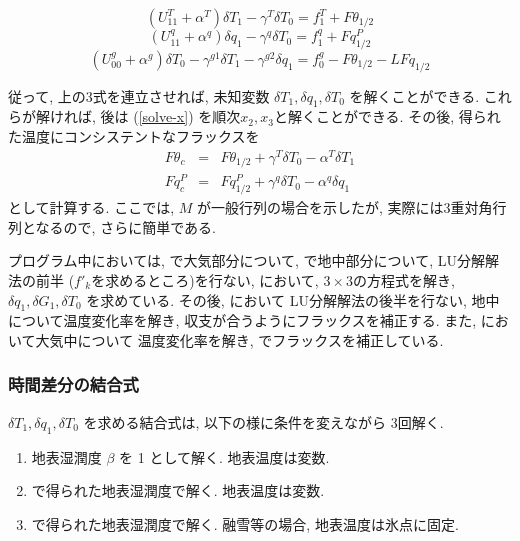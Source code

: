 \begin{equation}
  ( U^{T}_{11} +  \alpha^{T}  ) \delta T_1 - \gamma^{T} \delta T_0 
      = f^{T}_1 + F\theta_{1/2}
\end{equation}
\begin{equation}
  ( U^{q}_{11} +  \alpha^{q}  ) \delta q_1 - \gamma^{q} \delta T_0
      = f^{q}_1 + Fq^P_{1/2}
\end{equation}
\begin{equation}
  ( U^{g}_{00} +  \alpha^{g}  ) \delta T_0 - \gamma^{g1} \delta T_1
                                           - \gamma^{g2} \delta q_1
      = f^{g}_0 - F\theta_{1/2} - L Fq_{1/2}
\end{equation}

従って, 上の3式を連立させれば,
未知変数 $\delta T_1, \delta q_1, \delta T_0$ を解くことができる.
これらが解ければ, 後は
(\ref{solve-x}) を順次$x_2,x_3$と解くことができる.
%
その後, 得られた温度にコンシステントなフラックスを
\begin{eqnarray}
  F\theta_c & = & F\theta_{1/2} 
                   + \gamma^{T} \delta T_0 -\alpha^{T} \delta T_1 \\
  Fq^P_c & = & Fq^P_{1/2} 
                   + \gamma^{q} \delta T_0 -\alpha^{q} \delta q_1
\end{eqnarray}
として計算する.
%
ここでは, $M$ が一般行列の場合を示したが,
実際には3重対角行列となるので, さらに簡単である.

プログラム中においては,
 で大気部分について,
 で地中部分について, LU分解解法の前半
($f'_k$を求めるところ)を行ない, 
 において, $3\times 3$の方程式を解き,
$\delta q_1, \delta G_1, \delta T_0$ を求めている.
その後,  において
LU分解解法の後半を行ない, 地中について温度変化率を解き, 
収支が合うようにフラックスを補正する.
また,  において大気中について
温度変化率を解き, 
 でフラックスを補正している.

\subsubsection{時間差分の結合式}

$\delta T_1, \delta q_1, \delta T_0$ を求める結合式は, 
以下の様に条件を変えながら 3回解く. 
\begin{enumerate}
\item 地表湿潤度 $\beta$ を 1 として解く. 地表温度は変数. 
\item {} で得られた地表湿潤度で解く. 
      地表温度は変数.
\item {} で得られた地表湿潤度で解く. 
      融雪等の場合, 地表温度は氷点に固定. 
\end{enumerate}

